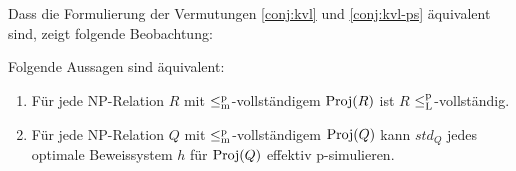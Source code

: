 Dass die Formulierung der Vermutungen \ref{conj:kvl} und \ref{conj:kvl-ps} äquivalent sind, zeigt folgende Beobachtung:
\begin{observation}\label{obs:kvl-equiv}
    Folgende Aussagen sind äquivalent:
    \begin{enumerate}
        \item Für jede NP-Relation $R$ mit $\leq_\mathrm{m}^\mathrm{p}$-vollständigem $\operatorname{Proj}(R)$ ist $R$ $\leq_\mathrm{L}^\mathrm{p}$-vollständig.
        \item Für jede NP-Relation $Q$ mit $\leq_\mathrm{m}^\mathrm{p}$-vollständigem $\operatorname{Proj}(Q)$ kann $\mathit{std}_Q$ jedes optimale Beweissystem $h$ für $\operatorname{Proj}(Q)$ effektiv p-simulieren.
    \end{enumerate}
\end{observation}
